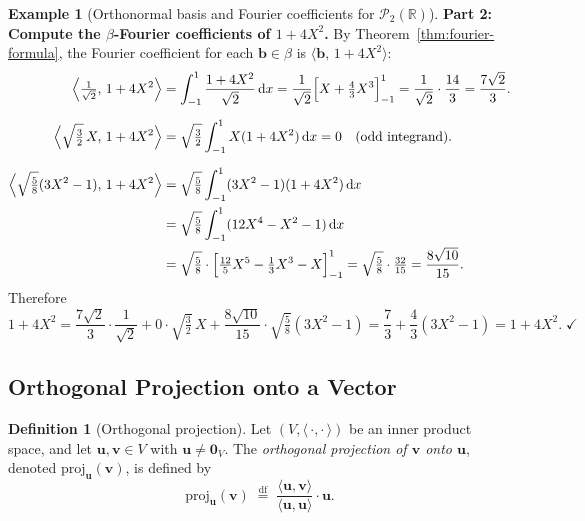 \documentclass[11pt, a4paper, notitlepage]{report}
\theoremstyle{definition}
\newtheorem{definition}[theorem]{Definition}
\newtheorem{example}[theorem]{Example}
\theoremstyle{remark}
\begin{document}
\begin{example}[Orthonormal basis and Fourier coefficients for $\mathscr{P}_2(\mathbb{R})$]
\medskip
\textbf{Part 2: Compute the $\beta$-Fourier coefficients of $1+4X^2$.}
By Theorem~\ref{thm:fourier-formula}, the Fourier coefficient for each $\mathbf{b}\in\beta$ is
$\langle\mathbf{b},\,1+4X^2\rangle$:
\begin{align*}
  \Bigl\langle\tfrac{1}{\sqrt{2}},\,1+4X^2\Bigr\rangle
  &= \int_{-1}^1\frac{1+4X^2}{\sqrt{2}}\,\mathrm{d}x
   = \frac{1}{\sqrt{2}}\Bigl[X+\tfrac{4}{3}X^3\Bigr]_{-1}^{1}
   = \frac{1}{\sqrt{2}}\cdot\frac{14}{3} = \frac{7\sqrt{2}}{3}.\\[6pt]
  \Bigl\langle\sqrt{\tfrac{3}{2}}\,X,\,1+4X^2\Bigr\rangle
  &= \sqrt{\tfrac{3}{2}}\int_{-1}^1 X(1+4X^2)\,\mathrm{d}x = 0
   \quad\text{(odd integrand).}\\[6pt]
  \Bigl\langle\sqrt{\tfrac{5}{8}}(3X^2-1),\,1+4X^2\Bigr\rangle
  &= \sqrt{\tfrac{5}{8}}\int_{-1}^1(3X^2-1)(1+4X^2)\,\mathrm{d}x \\
  &= \sqrt{\tfrac{5}{8}}\int_{-1}^1(12X^4-X^2-1)\,\mathrm{d}x \\
  &= \sqrt{\tfrac{5}{8}}\cdot\Bigl[\tfrac{12}{5}X^5-\tfrac{1}{3}X^3-X\Bigr]_{-1}^{1}
   = \sqrt{\tfrac{5}{8}}\cdot\tfrac{32}{15}
   = \frac{8\sqrt{10}}{15}.
\end{align*}
Therefore
\[
  1+4X^2
  = \frac{7\sqrt{2}}{3}\cdot\frac{1}{\sqrt{2}}
  + 0\cdot\sqrt{\tfrac{3}{2}}\,X
  + \frac{8\sqrt{10}}{15}\cdot\sqrt{\tfrac{5}{8}}(3X^2-1)
  = \frac{7}{3} + \frac{4}{3}(3X^2-1)
  = 1+4X^2.\;\checkmark
\]
\end{example}

\subsection{Orthogonal Projection onto a Vector}
\label{subsec:orth-proj}

\begin{definition}[Orthogonal projection]
\label{def:orth-proj}
Let $(V,\langle\,\cdot,\cdot\,\rangle)$ be an inner product space, and let
$\mathbf{u},\mathbf{v}\in V$ with $\mathbf{u}\neq\mathbf{0}_V$.
The \emph{orthogonal projection of $\mathbf{v}$ onto $\mathbf{u}$}, denoted
$\mathrm{proj}_{\mathbf{u}}(\mathbf{v})$, is defined by
\[
  \mathrm{proj}_{\mathbf{u}}(\mathbf{v})
  \;\stackrel{\mathrm{df}}{=}\;
  \frac{\langle\mathbf{u},\mathbf{v}\rangle}{\langle\mathbf{u},\mathbf{u}\rangle}\cdot\mathbf{u}.
\]
\end{definition}
\end{document}
